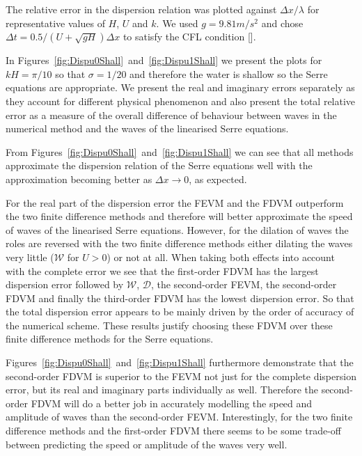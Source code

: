 The relative error in the dispersion relation was plotted against $\Delta x / \lambda$ for representative values of $H$, $U$ and $k$.  We used $g = 9.81m/s^2$ and chose $\Delta t = 0.5 / \left(U + \sqrt{gH}\right) \Delta x$ to satisfy the CFL condition [].

In Figures~\ref{fig:Dispu0Shall}~and~\ref{fig:Dispu1Shall} we present the plots for $kH = \pi / 10$ so that $\sigma = 1 / 20$ and therefore the water is shallow so the Serre equations are appropriate. We present the real and imaginary errors separately as they account for different physical phenomenon and also present the total relative error as a measure of the overall difference of behaviour between waves in the numerical method and the waves of the linearised Serre equations.

From Figures~\ref{fig:Dispu0Shall}~and~\ref{fig:Dispu1Shall} we can see that all methods approximate the dispersion relation of the Serre equations well with the approximation becoming better as $\Delta x \rightarrow 0$, as expected.

For the real part of the dispersion error the FEVM and the FDVM outperform the two finite difference methods and therefore will better approximate the speed of waves of the linearised Serre equations.  However, for the dilation of waves the roles are reversed with the two finite difference methods either dilating the waves very little ($\mathcal{W}$ for $U>0$) or not at all. When taking both effects into account with the complete error we see that the first-order FDVM has the largest dispersion error followed by $\mathcal{W}$, $\mathcal{D}$, the second-order FEVM, the second-order FDVM and finally the third-order FDVM has the lowest dispersion error. So that the total dispersion error appears to be mainly driven by the order of accuracy of the numerical scheme. These results justify choosing these FDVM over these finite difference methods for the Serre equations. 

Figures~\ref{fig:Dispu0Shall}~and~\ref{fig:Dispu1Shall} furthermore demonstrate that the second-order FDVM is superior to the FEVM not just for the complete dispersion error, but its real and imaginary parts individually as well. Therefore the second-order FDVM will do a better job in accurately modelling the speed and amplitude of waves than the second-order FEVM. Interestingly, for the two finite difference methods and the first-order FDVM there seems to be some trade-off between predicting the speed or amplitude of the waves very well. 

